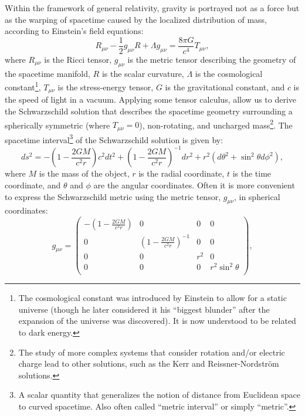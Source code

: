 \documentclass[main.tex]{subfiles}
\begin{document}
    Within the framework of general relativity, gravity is portrayed not as a force but as the warping of spacetime caused by the localized distribution of mass, according to Einstein's field equations:
    \begin{equation}\label{eq:gr_field_equation}
        R_{\mu \nu} - \frac{1}{2}g_{\mu \nu}R + \Lambda g_{\mu \nu} = \frac{8\pi G}{c^4} T_{\mu \nu}, 
    \end{equation}
    where $R_{\mu \nu}$ is the Ricci tensor, $g_{\mu \nu}$ is the metric tensor describing the geometry of the spacetime manifold, $R$ is the scalar curvature, $\Lambda$ is the cosmological constant\footnote{The cosmological constant was introduced by Einstein to allow for a static universe (though he later considered it his ``biggest blunder'' after the expansion of the universe was discovered). It is now understood to be related to dark energy.}, $T_{\mu \nu}$ is the stress-energy tensor, $G$ is the gravitational constant, and $c$ is the speed of light in a vacuum. Applying some tensor calculus, allow us to derive the Schwarzschild solution that describes the spacetime geometry surrounding a spherically symmetric (where $T_{\mu \nu} = 0$), non-rotating, and uncharged mass\footnote{The study of more complex systems that consider rotation and/or electric charge lead to other solutions, such as the Kerr and Reissner-Nordstr\"om solutions.}. The spacetime interval\footnote{A scalar quantity that generalizes the notion of distance from Euclidean space to curved spacetime. Also often called ``metric interval'' or simply ``metric''.} of the Schwarzschild solution is given by:
    \begin{equation}\label{eq:schwarzschild_metric}
        ds^2 = -\left(1 - \frac{2GM}{c^2r}\right)c^2dt^2 + \left(1 - \frac{2GM}{c^2r}\right)^{-1}dr^2 + r^2(d\theta^2 + \sin^2\theta d\phi^2),
    \end{equation}
    where $M$ is the mass of the object, $r$ is the radial coordinate, $t$ is the time coordinate, and $\theta$ and $\phi$ are the angular coordinates. 
    Often it is more convenient to express the Schwarzschild metric using the metric tensor, $g_{\mu \nu}$, in spherical coordinates:
    \begin{equation}\label{eq:schwarzschild_metric_matrix}
        g_{\mu\nu} = 
        \begin{pmatrix}
        -\left(1 - \frac{2GM}{c^2r}\right) & 0 & 0 & 0 \\
        0 & \left(1 - \frac{2GM}{c^2r}\right)^{-1} & 0 & 0 \\
        0 & 0 & r^2 & 0 \\
        0 & 0 & 0 & r^2\sin^2\theta \\
        \end{pmatrix},
    \end{equation}
\end{document}

